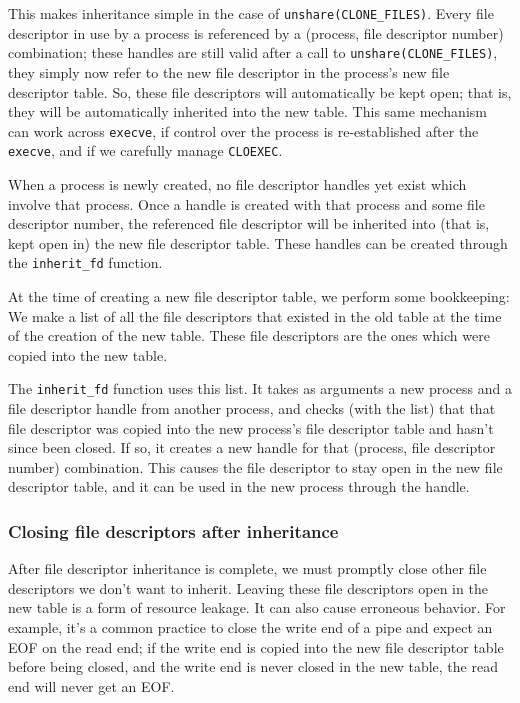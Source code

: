 \documentclass{acmart}
\begin{document}
This makes inheritance simple in the case of \verb|unshare(CLONE_FILES)|.
Every file descriptor in use by a process
is referenced by a (process, file descriptor number) combination;
these handles are still valid after a call to \verb|unshare(CLONE_FILES)|,
they simply now refer to the new file descriptor in the process's new file descriptor table.
So, these file descriptors will automatically be kept open;
that is, they will be automatically inherited into the new table.
This same mechanism can work across \texttt{execve},
if control over the process is re-established after the \texttt{execve},
and if we carefully manage \texttt{CLOEXEC}.

When a process is newly created,
no file descriptor handles yet exist which involve that process.
Once a handle is created with that process and some file descriptor number,
the referenced file descriptor will be inherited into (that is, kept open in) the new file descriptor table.
These handles can be created through the \verb|inherit_fd| function.

At the time of creating a new file descriptor table,
we perform some bookkeeping:
We make a list of all the file descriptors that existed in the old table
at the time of the creation of the new table.
These file descriptors are the ones which were copied into the new table.

The \verb|inherit_fd| function uses this list.
It takes as arguments a new process and a file descriptor handle from another process,
and checks (with the list) that that file descriptor was copied into the new process's file descriptor table
and hasn't since been closed.
If so, it creates a new handle for that (process, file descriptor number) combination.
This causes the file descriptor to stay open in the new file descriptor table,
and it can be used in the new process through the handle.
\subsubsection{Closing file descriptors after inheritance}
After file descriptor inheritance is complete,
we must promptly close other file descriptors we don't want to inherit.
Leaving these file descriptors open in the new table is a form of resource leakage.
It can also cause erroneous behavior.
For example, it's a common practice to close the write end of a pipe
and expect an EOF on the read end;
if the write end is copied into the new file descriptor table before being closed,
and the write end is never closed in the new table,
the read end will never get an EOF.
\end{document}
